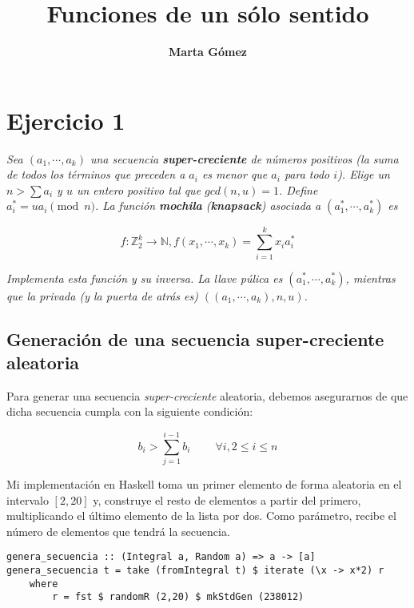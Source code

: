 \documentclass[10pt,spanish]{article}
\title{\fontfamily{pag}\selectfont \bfseries \Huge \color{azul} Funciones de un sólo sentido}
\author{\fontfamily{pag}\selectfont \bfseries \LARGE Marta Gómez}
\begin{document}
\maketitle
\tableofcontents

\renewcommand{\tablename}{Tabla}

\section{\textcolor{azul}Ejercicio 1}
\textit{Sea $(a_1,\cdots,a_k)$ una secuencia \textbf{\textcolor{azul}{super-creciente}} de números positivos (la suma de todos los términos que preceden a $a_i$ es menor que $a_i$ para todo $i$). Elige un $n > \sum a_i$ y $u$ un entero positivo tal que $gcd(n,u) = 1$. Define $a_i^* = ua_i \pmod n$. La función \textbf{\textcolor{azul}{mochila}} (\textbf{\textcolor{azul}{knapsack}}) asociada a $(a_1^*,\cdots,a_k^*)$ es}

\begin{displaymath}
    f: \mathbb{Z}_2^k \rightarrow \mathbb{N}, f(x_1,\cdots,x_k) = \sum_{i=1}^k x_i a_i^*
\end{displaymath}

\textit{Implementa esta función y su inversa. La llave púlica es $(a_1^*,\cdots,a_k^*)$, mientras que la privada (y la puerta de atrás es) $((a_1,\cdots,a_k),n,u)$.}

\subsection{\textcolor{azul}Generación de una secuencia super-creciente aleatoria}
Para generar una secuencia \textit{\textcolor{azul}{super-creciente}} aleatoria, debemos asegurarnos de que dicha secuencia cumpla con la siguiente condición:

\begin{displaymath}
    b_i > \sum_{j=1}^{i-1} b_i \qquad\ \forall i, 2 \leq i \leq n
\end{displaymath}

Mi implementación en Haskell toma un primer elemento de forma aleatoria en el intervalo $[2,20]$ y, construye el resto de elementos a partir del primero, multiplicando el último elemento de la lista por dos. Como parámetro, recibe el número de elementos que tendrá la secuencia.

\begin{verbatim}
genera_secuencia :: (Integral a, Random a) => a -> [a]
genera_secuencia t = take (fromIntegral t) $ iterate (\x -> x*2) r
    where
        r = fst $ randomR (2,20) $ mkStdGen (238012)
\end{verbatim}
\end{document}

